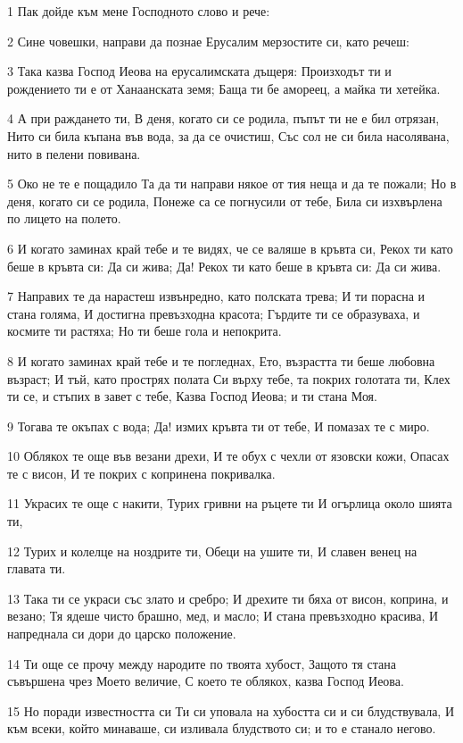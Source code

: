 \par 1 Пак дойде към мене Господното слово и рече:
\par 2 Сине човешки, направи да познае Ерусалим мерзостите си, като речеш:
\par 3 Така казва Господ Иеова на ерусалимската дъщеря: Произходът ти и рождението ти е от Ханаанската земя; Баща ти бе амореец, а майка ти хетейка.
\par 4 А при раждането ти, В деня, когато си се родила, пъпът ти не е бил отрязан, Нито си била къпана във вода, за да се очистиш, Със сол не си била насолявана, нито в пелени повивана.
\par 5 Око не те е пощадило Та да ти направи някое от тия неща и да те пожали; Но в деня, когато си се родила, Понеже са се погнусили от тебе, Била си изхвърлена по лицето на полето.
\par 6 И когато заминах край тебе и те видях, че се валяше в кръвта си, Рекох ти като беше в кръвта си: Да си жива; Да! Рекох ти като беше в кръвта си: Да си жива.
\par 7 Направих те да нарастеш извънредно, като полската трева; И ти порасна и стана голяма, И достигна превъзходна красота; Гърдите ти се образуваха, и космите ти растяха; Но ти беше гола и непокрита.
\par 8 И когато заминах край тебе и те погледнах, Ето, възрастта ти беше любовна възраст; И тъй, като прострях полата Си върху тебе, та покрих голотата ти, Клех ти се, и стъпих в завет с тебе, Казва Господ Иеова; и ти стана Моя.
\par 9 Тогава те окъпах с вода; Да! измих кръвта ти от тебе, И помазах те с миро.
\par 10 Облякох те още във везани дрехи, И те обух с чехли от язовски кожи, Опасах те с висон, И те покрих с копринена покривалка.
\par 11 Украсих те още с накити, Турих гривни на ръцете ти И огърлица около шията ти,
\par 12 Турих и колелце на ноздрите ти, Обеци на ушите ти, И славен венец на главата ти.
\par 13 Така ти се украси със злато и сребро; И дрехите ти бяха от висон, коприна, и везано; Тя ядеше чисто брашно, мед, и масло; И стана превъзходно красива, И напреднала си дори до царско положение.
\par 14 Ти още се прочу между народите по твоята хубост, Защото тя стана съвършена чрез Моето величие, С което те облякох, казва Господ Иеова.
\par 15 Но поради известността си Ти си уповала на хубостта си и си блудствувала, И към всеки, който минаваше, си изливала блудството си; и то е станало негово.
